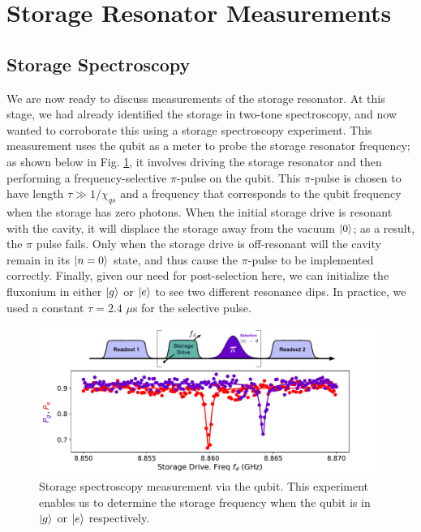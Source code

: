
\clearpage
\section{Storage Resonator Measurements \label{sec:4_StorageChi}}

\subsection{Storage Spectroscopy}

We are now ready to discuss measurements of the storage resonator. At this stage, we had already identified the storage in two-tone spectroscopy, and now wanted to corroborate this using a storage spectroscopy experiment. This measurement uses the qubit as a meter to probe the storage resonator frequency; as shown below in Fig. \ref{fig:4_storage_spectroscopy}, it involves driving the storage resonator and then performing a frequency-selective $\pi$-pulse on the qubit. This $\pi$-pulse is chosen to have length $\tau \gg 1/\chi_{qs}$ and a frequency that corresponds to the qubit frequency when the storage has zero photons. When the initial storage drive is resonant with the cavity, it will displace the storage away from the vacuum $\lvert0\rangle$; as a result, the $\pi$ pulse fails. Only when the storage drive is off-resonant will the cavity remain in its $\lvert n=0\rangle$ state, and thus cause the $\pi$-pulse to be implemented correctly. Finally, given our need for post-selection here, we can initialize the fluxonium in either $\lvert g\rangle$ or $\lvert e\rangle$ to see two different resonance dips. In practice, we used a constant $\tau = 2.4$ $\mu$s for the selective pulse.
\begin{figure}[h]
    \centering
    \includegraphics[width=0.85\linewidth]{Figures/4/storage_spectroscopy.pdf}
    \caption[Storage spectroscopy measurement.]{Storage spectroscopy measurement via the qubit. This experiment enables us to determine the storage frequency when the qubit is in $\lvert g\rangle$ or $\lvert e\rangle$ respectively.}
    \label{fig:4_storage_spectroscopy}
\end{figure}

